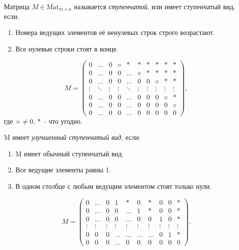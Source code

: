 \begin{definition}
    Матрица $M \in \text{Mat}_{m \times n}$ называется \textit{ступенчатой}, или имеет ступенчатый вид, если:
    \begin{enumerate}
    \item Номера ведущих элементов её ненулевых строк строго возрастают.
    \item Все нулевые строки стоят в конце.
    \end{enumerate}
\end{definition}
\begin{equation*}
    M = \begin{pmatrix}
        0 & \dots & 0 & \diamond & * & * & * & * & * & * \\
        0 & \dots & 0 & 0 & \dots & \diamond & * & * & * & * \\
        0 & \dots & 0 & 0 & \dots & 0 & 0 & \diamond & * & * \\
        \vdots & \ddots & \vdots & \vdots & \ddots & \vdots & \vdots & \vdots & \vdots & \vdots \\
        0 & \dots & 0 & 0 & \dots & 0 & 0 & 0 & \diamond & * \\
        0 & \dots & 0 & 0 & \dots & 0 & 0 & 0 & 0 & \diamond \\
        0 & \dots & 0 & 0 & \dots & 0 & 0 & 0 & 0 & 0
    \end{pmatrix}
,\end{equation*}
где $\diamond \neq 0$, $*$ -- что угодно. 

\begin{definition}
    M имеет \textit{улучшенный ступенчатый вид}, если:

    \begin{enumerate}[nosep]
    \item M имеет обычный ступенчатый вид.
    \item Все ведущие элементы равны 1.
    \item В одном столбце с любым ведущим элементом стоят только нули.
    \end{enumerate}
\end{definition}

\begin{equation*}
    M = \begin{pmatrix}
        0 & \dots & 0 & 1 & * & 0 & * & 0 & 0 & * \\
        0 & \dots & 0 & 0 & \dots & 1 & * & 0 & 0 & * \\
        0 & \dots & 0 & 0 & \dots & 0 & 0 & 1 & 0 & * \\
        \vdots & \vdots & \vdots & \vdots & \vdots & \vdots & \vdots & \vdots & \vdots & \vdots \\
        0 & 0 & 0 & \dots & \dots & \dots & \dots & 0 & 1 & * \\
        0 & 0 & 0 & \dots & 0 & 0 & 0 & 0 & 0 & 0
    \end{pmatrix}
.\end{equation*}

